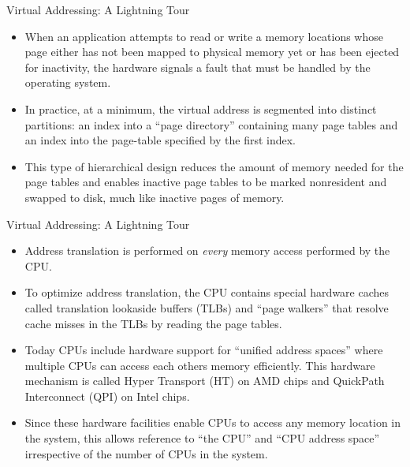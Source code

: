 \documentclass{beamer}
\begin{document}
\begin{frame}{Virtual Addressing: A Lightning Tour}
\begin{itemize}
\itemsep1em
    \item<1->When an application attempts to read or write a memory locations whose page either has not been mapped to physical memory yet or has been ejected for inactivity, the hardware signals a fault that must be handled by the operating system.
    \item<1->In practice, at a minimum, the virtual address is segmented into distinct partitions: an index into a ``page directory'' containing many page tables and an index into the page-table specified by the first index.
    \item<1->This type of hierarchical design reduces the amount of memory needed for the page tables and enables inactive page tables to be marked nonresident and swapped to disk, much like inactive pages of memory.
\end{itemize}
\end{frame}

\begin{frame}{Virtual Addressing: A Lightning Tour}
\begin{itemize}
    \item<1->Address translation is performed on \emph{every} memory access performed by the CPU.
    \item<1->To optimize address translation, the CPU contains special hardware caches called translation lookaside buffers (TLBs) and ``page walkers'' that resolve cache misses in the TLBs by reading the page tables.
    \item<1->Today CPUs include hardware support for ``unified address spaces'' where multiple CPUs can access each others memory efficiently.  This hardware mechanism is called Hyper Transport (HT) on AMD chips and QuickPath Interconnect (QPI) on Intel chips.
    \item<1->Since these hardware facilities enable CPUs to access any memory location in the system, this allows reference to ``the CPU'' and ``CPU address space'' irrespective of the number of CPUs in the system.
\end{itemize}
\end{frame}
\end{document}
